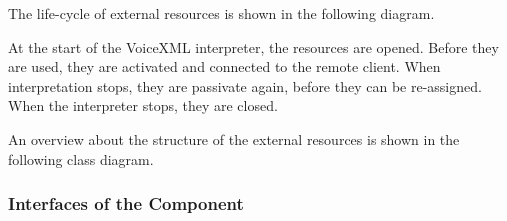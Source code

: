 \documentclass[11pt,a4paper]{article}
\begin{document}
The life-cycle of external resources is shown in the following diagram.
\begin{center}
\end{center}

At the start of the VoiceXML interpreter, the resources are opened. Before they
are used, they are activated and connected to the remote client. When
interpretation stops, they are passivate again, before they can be re-assigned.
When the interpreter stops, they are closed.

An overview about the structure of the external resources is shown in the
following class diagram.
\begin{center}
\end{center}

\subsubsection{Interfaces of the Component}
\end{document}
